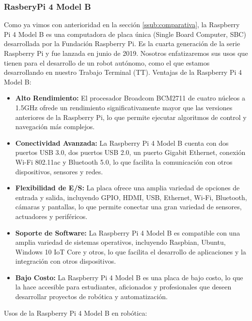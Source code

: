 \subsubsection{RasberyPi 4 Model B} %
\label{subsubsection:rasp4}
    Como ya vimos con anterioridad en la secci\'on \ref{ssub:comparativa}, la Raspberry Pi 4 Model B es una computadora de placa \'unica 
    (Single Board Computer, SBC) desarrollada por la Fundaci\'on Raspberry Pi. Es la cuarta generaci\'on de la serie Raspberry Pi y fue lanzada en 
        junio de 2019. Nosotros enfatizaremos sus usos que tienen para el desarrollo de un robot aut\'onomo, como el que estamos
        desarrollando en nuestro Trabajo Terminal (TT).
    \vskip 0.5cm
    Ventajas de la Raspberry Pi 4 Model B:
    \begin{itemize}
        \item \textbf{Alto Rendimiento:} El procesador Broadcom BCM2711 de cuatro n\'ucleos a 1.5GHz ofrede un rendimiento 
            significativamente mayor que las versiones anteriores de la Raspberry Pi, lo que permite ejecutar algoritmos 
            de control y navegaci\'on m\'as complejos.
        \item \textbf{Conectividad Avanzada:} La Raspberry Pi 4 Model B cuenta con dos puertos USB 3.0, dos puertos USB 2.0, 
            un puerto Gigabit Ethernet, conexi\'on Wi-Fi 802.11ac y Bluetooth 5.0, lo que facilita la comunicaci\'on con otros
            dispositivos, sensores y redes.
        \item \textbf{Flexibilidad de E/S:} La placa ofrece una amplia variedad de opciones de entrada y salida, incluyendo
            GPIO, HDMI, USB, Ethernet, Wi-Fi, Bluetooth, c\'amaras y pantallas, lo que permite conectar una gran variedad de
            sensores, actuadores y perif\'ericos.
        \item \textbf{Soporte de Software:} La Raspberry Pi 4 Model B es compatible con una amplia variedad de sistemas
            operativos, incluyendo Raspbian, Ubuntu, Windows 10 IoT Core y otros, lo que facilita el desarrollo de aplicaciones
            y la integraci\'on con otros dispositivos.
        \item \textbf{Bajo Costo:} La Raspberry Pi 4 Model B es una placa de bajo costo, lo que la hace accesible para
            estudiantes, aficionados y profesionales que deseen desarrollar proyectos de rob\'otica y automatizaci\'on.
    \end{itemize}
    \vskip 0.5cm
    Usos de la Raspberry Pi 4 Model B en rob\'otica:
